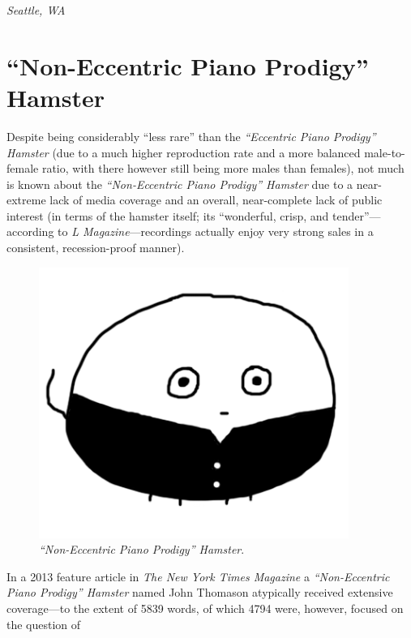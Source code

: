 \documentclass[10pt,twoside,openright]{memoir}
\begin{document}
\hspace{7em} {\em Seattle, WA}

\chapter*{``Non-Eccentric Piano Prodigy'' Hamster}

Despite being considerably ``less rare'' than the {\em ``Eccentric Piano
Prodigy'' Hamster} (due to a much higher reproduction rate and a more balanced
male-to-female ratio, with there however still being more males than females),
not much is known about the {\em ``Non-Eccentric Piano Prodigy'' Hamster} due to
a near-extreme lack of media coverage and an overall, near-complete lack of
public interest (in terms of the hamster itself; its ``wonderful, crisp, and
tender''---according to {\em L Magazine}---recordings actually enjoy very
strong sales in a consistent, recession-proof manner). 
\begin{figure}[t!]
\begin{center}
\includegraphics[width=0.9\textwidth]{img/noneccentricpianoprodigy}
\end{center}
\caption*{{\em ``Non-Eccentric Piano Prodigy'' Hamster}.}
\end{figure}
In a 2013 feature article
in {\em The New York Times Magazine} a {\em ``Non-Eccentric Piano Prodigy'' 
Hamster} named John Thomason atypically received extensive coverage---to the 
extent of 5839 words, of which 4794 were, however, focused on the question of 
\end{document}

